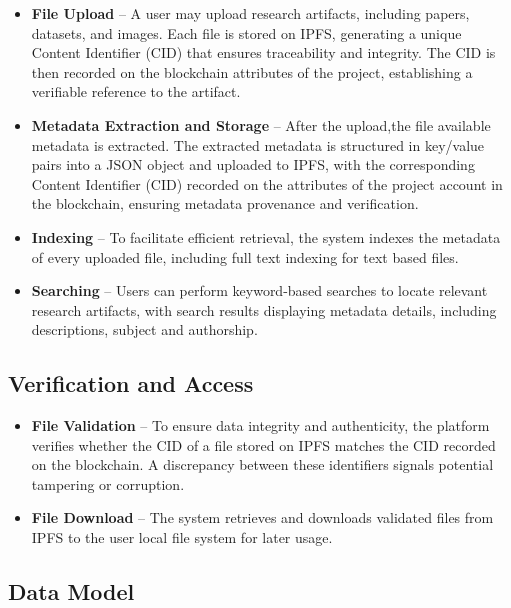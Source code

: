 \documentclass{article}
\begin{document}
\begin{itemize}
      \item \textbf{File Upload} – A user may upload research artifacts, including papers, datasets, and images. Each file is stored on IPFS, generating a unique Content Identifier (CID) that ensures traceability and integrity. The CID is then recorded on the blockchain attributes of the project, establishing a verifiable reference to the artifact.

      \item \textbf{Metadata Extraction and Storage} – After the upload,the file available metadata is extracted. The extracted metadata is structured in key/value pairs into a JSON object and uploaded to IPFS, with the corresponding Content Identifier (CID) recorded on the attributes of the project account in the blockchain, ensuring metadata provenance and verification.

      \item \textbf{Indexing} – To facilitate efficient retrieval, the system indexes the metadata of every uploaded file, including full text indexing for text based files.

      \item \textbf{Searching} – Users can perform keyword-based searches to locate relevant research artifacts, with search results displaying metadata details, including descriptions, subject and authorship.
\end{itemize}


\subsection{Verification and Access}

\begin{itemize}
      \item \textbf{File Validation} – To ensure data integrity and authenticity, the platform verifies whether the CID of a file stored on IPFS matches the CID recorded on the blockchain. A discrepancy between these identifiers signals potential tampering or corruption.

      \item \textbf{File Download} – The system retrieves and downloads validated files from IPFS to the user local file system for later usage.
\end{itemize}


\subsection{Data Model}
\end{document}

